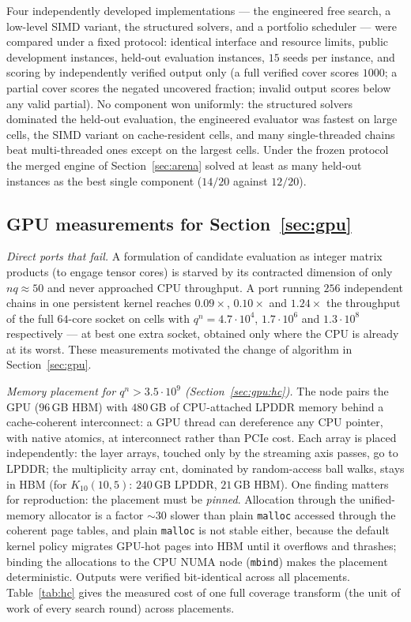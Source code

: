 \documentclass[11pt]{amsart}
\newcommand{\Kq}[3]{K_{#1}(#2,#3)}
\begin{document}
Four independently developed implementations --- the engineered free
search, a low-level SIMD variant, the structured solvers, and a portfolio
scheduler --- were compared under a fixed protocol: identical interface
and resource limits, public development instances, held-out evaluation
instances, $15$ seeds per instance, and scoring by independently verified
output only (a full verified cover scores $1000$; a partial cover scores
the negated uncovered fraction; invalid output scores below any valid
partial). No component won uniformly: the structured solvers dominated the
held-out evaluation, the engineered evaluator was fastest on large cells,
the SIMD variant on cache-resident cells, and many single-threaded chains
beat multi-threaded ones except on the largest cells. Under the frozen
protocol the merged engine of Section~\ref{sec:arena} solved at least as
many held-out instances as the best single component ($14/20$ against
$12/20$).

\subsection{GPU measurements for Section~\textup{\ref{sec:gpu}}}
\label{app:impl:gpu}

\emph{Direct ports that fail.} A formulation of candidate evaluation as
integer matrix products (to engage tensor cores) is starved by its
contracted dimension of only $nq\approx 50$ and never approached CPU
throughput. A port running $256$ independent chains in one persistent
kernel reaches $0.09\times$, $0.10\times$ and $1.24\times$ the throughput
of the full $64$-core socket on cells with $q^n=4.7\cdot 10^4$,
$1.7\cdot 10^6$ and $1.3\cdot 10^8$ respectively --- at best one extra
socket, obtained only where the CPU is already at its worst. These
measurements motivated the change of algorithm in Section~\ref{sec:gpu}.

\emph{Memory placement for $q^n>3.5\cdot 10^9$
(Section~\textup{\ref{sec:gpu:hc}}).} The node pairs the GPU ($96$\,GB
HBM) with $480$\,GB of CPU-attached LPDDR memory behind a cache-coherent
interconnect: a GPU thread can dereference any CPU pointer, with native
atomics, at interconnect rather than PCIe cost. Each array is placed
independently: the layer arrays, touched only by the streaming axis
passes, go to LPDDR; the multiplicity array $\mathrm{cnt}$, dominated by
random-access ball walks, stays in HBM (for $\Kq{10}{10}{5}$: $240$\,GB
LPDDR, $21$\,GB HBM). One finding matters for reproduction: the placement
must be \emph{pinned}. Allocation through the unified-memory allocator is
a factor ${\sim}30$ slower than plain \texttt{malloc} accessed through the
coherent page tables, and plain \texttt{malloc} is not stable either,
because the default kernel policy migrates GPU-hot pages into HBM until it
overflows and thrashes; binding the allocations to the CPU NUMA node
(\texttt{mbind}) makes the placement deterministic. Outputs were verified
bit-identical across all placements. Table~\ref{tab:hc} gives the measured
cost of one full coverage transform (the unit of work of every search
round) across placements.
\end{document}
